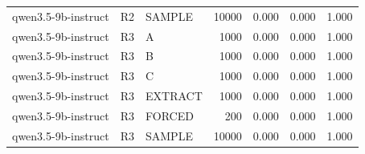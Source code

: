 \begin{table}
\begin{tabular}{lllrrrr}
qwen3.5-9b-instruct & R2 & SAMPLE & 10000 & 0.000 & 0.000 & 1.000 \\
qwen3.5-9b-instruct & R3 & A & 1000 & 0.000 & 0.000 & 1.000 \\
qwen3.5-9b-instruct & R3 & B & 1000 & 0.000 & 0.000 & 1.000 \\
qwen3.5-9b-instruct & R3 & C & 1000 & 0.000 & 0.000 & 1.000 \\
qwen3.5-9b-instruct & R3 & EXTRACT & 1000 & 0.000 & 0.000 & 1.000 \\
qwen3.5-9b-instruct & R3 & FORCED & 200 & 0.000 & 0.000 & 1.000 \\
qwen3.5-9b-instruct & R3 & SAMPLE & 10000 & 0.000 & 0.000 & 1.000 \\
\bottomrule
\end{tabular}
\end{table}
